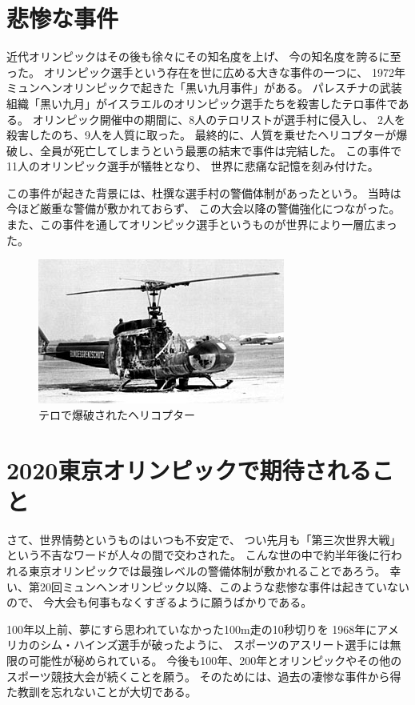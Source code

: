 \documentclass{jsarticle}
\begin{document}
\section{悲惨な事件}
近代オリンピックはその後も徐々にその知名度を上げ、
今の知名度を誇るに至った。
オリンピック選手という存在を世に広める大きな事件の一つに、
1972年ミュンヘンオリンピックで起きた「黒い九月事件」がある。
パレスチナの武装組織「黒い九月」がイスラエルのオリンピック選手たちを殺害したテロ事件である。
オリンピック開催中の期間に、8人のテロリストが選手村に侵入し、
2人を殺害したのち、9人を人質に取った。
最終的に、人質を乗せたヘリコプターが爆破し、全員が死亡してしまうという最悪の結末で事件は完結した。
この事件で11人のオリンピック選手が犠牲となり、
世界に悲痛な記憶を刻み付けた。

この事件が起きた背景には、杜撰な選手村の警備体制があったという。
当時は今ほど厳重な警備が敷かれておらず、
この大会以降の警備強化につながった。
また、この事件を通してオリンピック選手というものが世界により一層広まった。

\begin{figure}[h]
    \centering
    \includegraphics{heli.jpg}
    \caption{テロで爆破されたヘリコプター}
\end{figure}

\section{2020東京オリンピックで期待されること}
さて、世界情勢というものはいつも不安定で、
つい先月も「第三次世界大戦」という不吉なワードが人々の間で交わされた。
こんな世の中で約半年後に行われる東京オリンピックでは最強レベルの警備体制が敷かれることであろう。
幸い、第20回ミュンヘンオリンピック以降、このような悲惨な事件は起きていないので、
今大会も何事もなくすぎるように願うばかりである。

100年以上前、夢にすら思われていなかった100m走の10秒切りを
1968年にアメリカのシム・ハインズ選手が破ったように、
スポーツのアスリート選手には無限の可能性が秘められている。
今後も100年、200年とオリンピックやその他のスポーツ競技大会が続くことを願う。
そのためには、過去の凄惨な事件から得た教訓を忘れないことが大切である。
\end{document}
